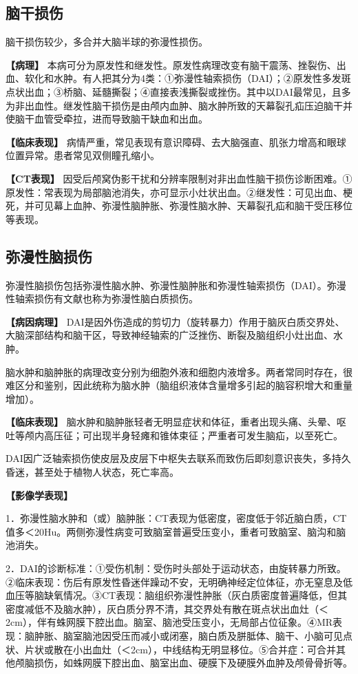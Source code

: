 \subsection{脑干损伤}

脑干损伤较少，多合并大脑半球的弥漫性损伤。

\textbf{【病理】}
本病可分为原发性和继发性。原发性病理改变有脑干震荡、挫裂伤、出血、软化和水肿。有人把其分为4类：①弥漫性轴索损伤（DAI）；②原发性多发斑点状出血；③桥脑、延髓撕裂；④直接表浅撕裂或挫伤。其中以DAI最常见，且多为非出血性。继发性脑干损伤是由颅内血肿、脑水肿所致的天幕裂孔疝压迫脑干并使脑干血管受牵拉，进而导致脑干缺血和出血。

\textbf{【临床表现】}
病情严重，常见表现有意识障碍、去大脑强直、肌张力增高和眼球位置异常。患者常见双侧瞳孔缩小。

\textbf{【CT表现】}
因受后颅窝伪影干扰和分辨率限制对非出血性脑干损伤诊断困难。①原发性：常表现为局部脑池消失，亦可显示小灶状出血。②继发性：可见出血、梗死，并可见幕上血肿、弥漫性脑肿胀、弥漫性脑水肿、天幕裂孔疝和脑干受压移位等表现。

\subsection{弥漫性脑损伤}

弥漫性脑损伤包括弥漫性脑水肿、弥漫性脑肿胀和弥漫性轴索损伤（DAI）。弥漫性轴索损伤有文献也称为弥漫性脑白质损伤。

\textbf{【病因病理】}
DAI是因外伤造成的剪切力（旋转暴力）作用于脑灰白质交界处、大脑深部结构和脑干区，导致神经轴索的广泛挫伤、断裂及脑组织小灶出血、水肿。

脑水肿和脑肿胀的病理改变分别为细胞外液和细胞内液增多。两者常同时存在，很难区分和鉴别，因此统称为脑水肿（脑组织液体含量增多引起的脑容积增大和重量增加）。

\textbf{【临床表现】}
脑水肿和脑肿胀轻者无明显症状和体征，重者出现头痛、头晕、呕吐等颅内高压征；可出现半身轻瘫和锥体束征；严重者可发生脑疝，以至死亡。

DAI因广泛轴索损伤使皮层及皮层下中枢失去联系而致伤后即刻意识丧失，多持久昏迷，甚至处于植物人状态，死亡率高。

\textbf{【影像学表现】}

1．弥漫性脑水肿和（或）脑肿胀：CT表现为低密度，密度低于邻近脑白质，CT值多＜20Hu。两侧弥漫性病变可致脑室普遍受压变小，重者可致脑室、脑沟和脑池消失。

2．DAI的诊断标准：①受伤机制：受伤时头部处于运动状态，由旋转暴力所致。②临床表现：伤后有原发性昏迷伴躁动不安，无明确神经定位体征，亦无窒息及低血压等脑缺氧情况。③CT表现：脑组织弥漫性肿胀（灰白质密度普遍降低，但其密度减低不及脑水肿），灰白质分界不清，其交界处有散在斑点状出血灶（＜2cm），伴有蛛网膜下腔出血。脑室、脑池受压变小，无局部占位征象。④MR表现：脑肿胀、脑室脑池因受压而减小或闭塞，脑白质及胼胝体、脑干、小脑可见点状、片状或散在小出血灶（＜2cm），中线结构无明显移位。⑤合并症：可合并其他颅脑损伤，如蛛网膜下腔出血、脑室出血、硬膜下及硬膜外血肿及颅骨骨折等。

